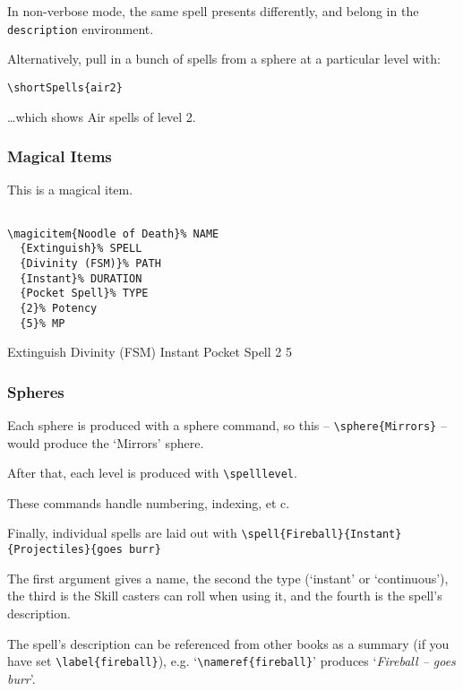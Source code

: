 \documentclass[a4paper,openany]{book}
\begin{document}
\begin{multicols}{2}
In non-verbose mode, the same spell presents differently, and belong in the \verb"description" environment.



Alternatively, pull in a bunch of spells from a sphere at a particular level with:

\verb"\shortSpells{air2}"

\ldots which shows Air spells of level 2.


\subsubsection{Magical Items}

This is a magical item.

\begin{verbatim}

\magicitem{Noodle of Death}% NAME
  {Extinguish}% SPELL
  {Divinity (FSM)}% PATH
  {Instant}% DURATION
  {Pocket Spell}% TYPE
  {2}% Potency
  {5}% MP

\end{verbatim}

  {Extinguish}%
  {Divinity (FSM)}%
  {Instant}%
  {Pocket Spell}%
  {2}%
  {5}%

\subsubsection{Spheres}

Each sphere is produced with a sphere command, so this -- \verb"\sphere{Mirrors}" -- would produce the `Mirrors' sphere.

After that, each level is produced with \verb"\spelllevel".

These commands handle numbering, indexing, et c.

Finally, individual spells are laid out with \verb"\spell{Fireball}{Instant}{Projectiles}{goes burr}"

The first argument gives a name, the second the type (`instant' or `continuous'), the third is the Skill casters can roll when using it, and the fourth is the spell's description.

The spell's description can be referenced from other books as a summary (if you have set \verb"\label{fireball}"), e.g. `\verb"\nameref{fireball}"' produces `\textit{Fireball -- goes burr}'.


\end{multicols}
\end{document}
